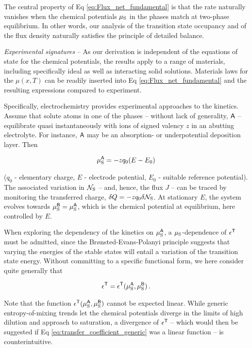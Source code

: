 \documentclass[english,aps,prb,showkeys,reprint]{revtex4-2}
\newcommand{\be}{\begin{equation}}
\newcommand{\ee}{\end{equation}}
\begin{document}
The central property of Eq \ref{eq:Flux_net_fundamental} is that the rate naturally vanishes when the chemical potentials $\mu_{\rm S}$ in the phases match at two-phase equilibrium. In other words, our analysis of the transition state occupancy and of the flux density naturally satisfies the principle of detailed balance.

\textit{Experimental signatures}
--
As our derivation is independent of the equations of state for the chemical potentials, the results apply to a range of materials, including specifically ideal as well as interacting solid solutions. Materials laws for the $\mu(x,T)$ can be readily inserted into Eq \ref{eq:Flux_net_fundamental} and the resulting expressions compared to experiment.

Specifically, electrochemistry provides experimental approaches to the kinetics. Assume that solute atoms in one of the phases -- without lack of generality, $\sf A$ -- equilibrate quasi instantaneously with ions of signed valency $z$ in an abutting electrolyte. For instance, $\sf A$ may be an absorption- or underpotential deposition layer. Then \cite{Kortuem1972}

\be
\label{eq:mu_vs_E}
\mu^{\sf A}_{\rm S} = - z q_0 (E-E_0)
\ee

($q_0$ - elementary charge, $E$ - electrode potential, $E_0$ - suitable reference potential). The associated variation in $\mathcal{N}_{\rm S}$ -- and, hence, the flux $J$ -- can be traced by monitoring the transferred charge, $\delta Q =   - z q_0  \delta \mathcal{N}_{\rm S}$. At stationary $E$, the system evolves towards $\mu^{\sf B}_{\rm S} = \mu^{\sf A}_{\rm S}$, which is the chemical potential at equilibrium, here controlled by $E$.

When exploring the dependency of the kinetics on $\mu^{\sf A}_{\rm S}$, a $\mu_{\rm S}$-dependence of $\epsilon^{\sf T}$ must be admitted, since the Brønsted-Evans-Polanyi principle \cite{VanSanten2009} suggests that varying the energies of the stable states will entail a variation of the transition state energy. Without committing to a specific functional form, we here consider quite generally that

\be
\label{eq:transfer_coefficient_generic}
\epsilon^{\sf T}
=
\epsilon^{\sf T}(\mu^{\sf A}_{\rm S},\mu^{\sf B}_{\rm S}) \,.
\ee

Note that the function $\epsilon^{\sf T}(\mu^{\sf A}_{\rm S},\mu^{\sf B}_{\rm S})$ cannot be expected linear. While generic entropy-of-mixing trends let the chemical potentials diverge in the limits of high dilution and approach to saturation, a divergence of $\epsilon^{\sf T}$ -- which would then be suggested if Eq \ref{eq:transfer_coefficient_generic} was a linear function -- is counterintuitive.
\end{document}

